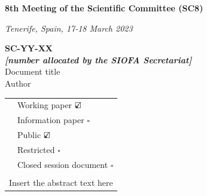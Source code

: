 \documentclass[english,12pt,a4paper,final,twoside,titlepage,pdftex]{article}
\newcommand\CheckBoxTick{$\text{\rlap{$\checkmark$}}\square$}
\newcommand\CheckBoxUntick{$\square$}
\begin{document}
  \sloppy %


  \begin{center}
    \thispagestyle{firststyle}
    \vspace*{2cm}
    \small{\textbf{8th Meeting of the Scientific Committee (SC8)}}

    \vspace*{0.25cm}
    \emph{Tenerife, Spain, 17-18 March 2023}
		
    \vspace*{1cm}
    \textbf{SC-YY-XX\\ \emph{[number allocated by the SIOFA Secretariat]}}\\
    \vspace*{0.5cm}	
    \huge{Document title} \\
    \vspace*{1cm}	
    \large{Author}
  \end{center}

  \begin{table}[H]
    \begin{tabular}{|m{4cm}|m{11cm}|}
      \hline
      \textbf{\color{blue}{Document type}} &  Working paper \CheckBoxTick \\
      & Information paper \CheckBoxUntick \\
      \hline
      \textbf{\color{blue}{Distribution}} & Public \CheckBoxTick \\
      & Restricted \footnotemark[1] \CheckBoxUntick\\
      & Closed session document \footnotemark[2] \CheckBoxUntick\\
      \hline
      \multicolumn{2}{|l|}{\textbf{\color{blue}{Abstract}}} \\
      \hline
      \multicolumn{2}{|l|}{Insert the abstract text here} \\
      \hline
    \end{tabular}%
  \end{table}

\end{document}

